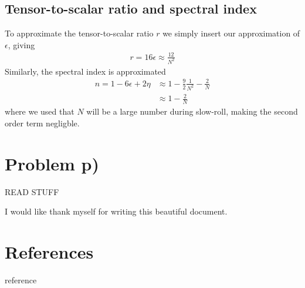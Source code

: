\documentclass[reprint,english,notitlepage]{revtex4-1}  %
\numberwithin{equation}{section}
\begin{document}
\subsection{Tensor-to-scalar ratio and spectral index}
To approximate the tensor-to-scalar ratio $r$ we simply insert our approximation
of $\epsilon$, giving
\begin{align}
	r = 16\epsilon \approx \frac{12}{N^2}
\end{align}
Similarly, the spectral index is approximated
\begin{align}
	n = 1 - 6\epsilon + 2\eta &\approx 1 - \frac{9}{2}\frac{1}{N^2} - \frac{2}{N} \\
														&\approx 1 - \frac{2}{N}
\end{align}
where we used that $N$ will be a large number during slow-roll, making the
second order term negligble.
\section{Problem p)}
READ STUFF

\begin{acknowledgments}  %
I would like thank myself for writing this beautiful document.
\end{acknowledgments}

\section*{References}

\begin{itemize}
	 reference
\end{itemize}
\end{document}
